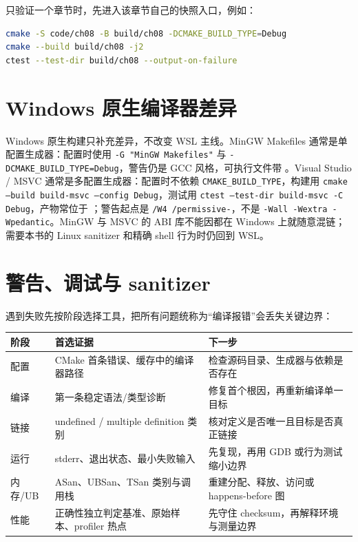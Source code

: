 只验证一个章节时，先进入该章节自己的快照入口，例如：

\begin{lstlisting}[language=bash,numbers=none]
cmake -S code/ch08 -B build/ch08 -DCMAKE_BUILD_TYPE=Debug
cmake --build build/ch08 -j2
ctest --test-dir build/ch08 --output-on-failure
\end{lstlisting}

\section{Windows 原生编译器差异}

Windows 原生构建只补充差异，不改变 WSL 主线。MinGW Makefiles 通常是单配置生成器：配置时使用 \texttt{-G "MinGW Makefiles"} 与 \texttt{-DCMAKE\_BUILD\_TYPE=Debug}，警告仍是 GCC 风格，可执行文件带 。Visual Studio / MSVC 通常是多配置生成器：配置时不依赖 \texttt{CMAKE\_BUILD\_TYPE}，构建用 \texttt{cmake --build build-msvc --config Debug}，测试用 \texttt{ctest --test-dir build-msvc -C Debug}，产物常位于 ；警告起点是 \texttt{/W4 /permissive-}，不是 \texttt{-Wall -Wextra -Wpedantic}。MinGW 与 MSVC 的 ABI 库不能因都在 Windows 上就随意混链；需要本书的 Linux sanitizer 和精确 shell 行为时仍回到 WSL。

\section{警告、调试与 sanitizer}

遇到失败先按阶段选择工具，把所有问题统称为“编译报错”会丢失关键边界：

\begin{center}
\begin{tabularx}{\textwidth}{@{}p{}p{}X@{}}
\toprule
阶段 & 首选证据 & 下一步 \\
\midrule
配置 & CMake 首条错误、缓存中的编译器路径 & 检查源码目录、生成器与依赖是否存在 \\
编译 & 第一条稳定语法/类型诊断 & 修复首个根因，再重新编译单一目标 \\
链接 & undefined / multiple definition 类别 & 核对定义是否唯一且目标是否真正链接 \\
运行 & stderr、退出状态、最小失败输入 & 先复现，再用 GDB 或行为测试缩小边界 \\
内存/UB & ASan、UBSan、TSan 类别与调用栈 & 重建分配、释放、访问或 happens-before 图 \\
性能 & 正确性独立判定基准、原始样本、profiler 热点 & 先守住 checksum，再解释环境与测量边界 \\
\bottomrule
\end{tabularx}
\end{center}

